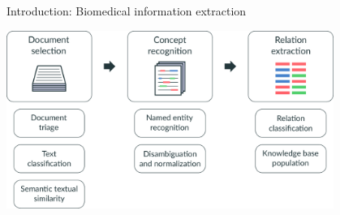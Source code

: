 \endgroup
\begin{frame}[t]{Introduction: Biomedical information extraction}

\centering


\includegraphics[width=0.80\textwidth]{img/biomedical-information-extraction/v3/003.pdf}%

\end{frame}
